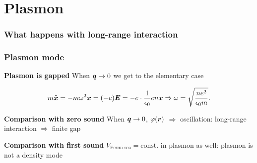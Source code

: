 \documentclass{beamer}
\begin{document}
\section{Plasmon}

\begin{frame}
\frametitle{What happens with long-range interaction}



\end{frame}

\begin{frame}
\frametitle{Plasmon mode}

\textbf{Plasmon is gapped} When $\vb*{q} \to 0$ we get to the elementary case

\begin{center}
    
\end{center}
\begin{equation}
    m \ddot{\vb*{x}} = - m \omega^2 \vb*{x} = (- e) \vb*{E} = - e \cdot \frac{1}{\epsilon_0} e n \vb*{x} 
    \Rightarrow \omega = \sqrt{\frac{n e^2}{\epsilon_0 m}}.
\end{equation}

\vspace{0.25cm}

\textbf{Comparison with zero sound} When $\vb*{q} \to 0$, $\varphi(\vb*{r})$ $\Rightarrow$ oscillation:
long-range interaction $\Rightarrow$ finite gap

\vspace{0.25cm}

\textbf{Comparison with first sound} $V_{\text{Fermi sea}} = \text{const.}$ in plasmon as well:
plasmon is not a density mode

\end{frame}
\end{document}

